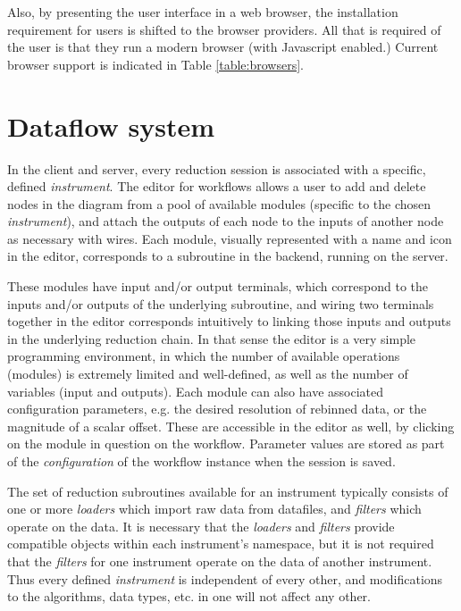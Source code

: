 \documentclass[pdf]{iucr}           %
\begin{document}
Also, by presenting the user interface in a web browser, the installation requirement for users is shifted to the
browser providers.  All that is required of the user is that they run a modern browser (with Javascript
enabled.)
Current browser support is indicated in Table \ref{table:browsers}.

\section{Dataflow system}

In the client and server, every reduction session is associated with a specific, defined \emph{instrument}.
The editor for workflows allows a user to add and delete nodes in the diagram from a pool
of available modules (specific to the chosen \emph{instrument}), and attach the outputs of each node 
to the inputs of another node as necessary with wires. Each module, visually represented with 
a name and icon in the editor, corresponds to a subroutine in the 
backend, running on the server.

These modules have input and/or output terminals, which correspond to the 
inputs and/or outputs of the underlying subroutine, and wiring two terminals together in the editor
corresponds intuitively to linking those inputs and outputs in the underlying reduction chain.  In that sense 
the editor is a very simple programming environment, in which the number of available operations (modules)
is extremely limited and well-defined, as well as the number of variables (input and outputs).
Each module can also have associated configuration parameters, e.g. the desired resolution of rebinned 
data, or the magnitude of a scalar offset.  These are accessible in the editor as well, by 
clicking on the module in question on the workflow.  Parameter values are stored as part of the 
\emph{configuration} of the workflow instance when the session is saved.

The set of reduction subroutines available for an instrument typically consists
of one or more \emph{loaders} which import raw data from datafiles, and \emph{filters} which operate
on the data.  It is necessary that the \emph{loaders} and \emph{filters}
provide compatible objects within each
instrument's namespace, but it is not required that the \emph{filters} for one instrument operate on the data
of another instrument.  Thus every defined \emph{instrument} is independent of every other, and modifications
to the algorithms, data types, etc. in one will not affect any other. 
\end{document}

